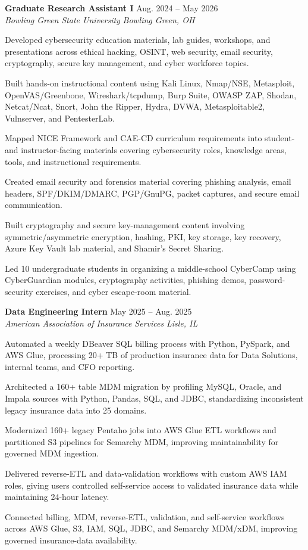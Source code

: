 \documentclass[letterpaper,10pt]{article}
\newcommand{\resumeSubheading}[4]{
  \vspace{2pt}
  \textbf{#1} \hfill #2\\
  \textit{#3} \hfill \textit{#4}
}
\begin{document}
\resumeSubheading
{Graduate Research Assistant I}{Aug. 2024 -- May 2026}
{Bowling Green State University}{Bowling Green, OH}
\begin{tightitemize}
  \item Developed cybersecurity education materials, lab guides, workshops, and presentations across ethical hacking, OSINT, web security, email security, cryptography, secure key management, and cyber workforce topics.
  \item Built hands-on instructional content using Kali Linux, Nmap/NSE, Metasploit, OpenVAS/Greenbone, Wireshark/tcpdump, Burp Suite, OWASP ZAP, Shodan, Netcat/Ncat, Snort, John the Ripper, Hydra, DVWA, Metasploitable2, Vulnserver, and PentesterLab.
  \item Mapped NICE Framework and CAE-CD curriculum requirements into student- and instructor-facing materials covering cybersecurity roles, knowledge areas, tools, and instructional requirements.
  \item Created email security and forensics material covering phishing analysis, email headers, SPF/DKIM/DMARC, PGP/GnuPG, packet captures, and secure email communication.
  \item Built cryptography and secure key-management content involving symmetric/asymmetric encryption, hashing, PKI, key storage, key recovery, Azure Key Vault lab material, and Shamir's Secret Sharing.
  \item Led 10 undergraduate students in organizing a middle-school CyberCamp using CyberGuardian modules, cryptography activities, phishing demos, password-security exercises, and cyber escape-room material.
\end{tightitemize}

\resumeSubheading
{Data Engineering Intern}{May 2025 -- Aug. 2025}
{American Association of Insurance Services}{Lisle, IL}
\begin{tightitemize}
  \item Automated a weekly DBeaver SQL billing process with Python, PySpark, and AWS Glue, processing 20+ TB of production insurance data for Data Solutions, internal teams, and CFO reporting.
  \item Architected a 160+ table MDM migration by profiling MySQL, Oracle, and Impala sources with Python, Pandas, SQL, and JDBC, standardizing inconsistent legacy insurance data into 25 domains.
  \item Modernized 160+ legacy Pentaho jobs into AWS Glue ETL workflows and partitioned S3 pipelines for Semarchy MDM, improving maintainability for governed MDM ingestion.
  \item Delivered reverse-ETL and data-validation workflows with custom AWS IAM roles, giving users controlled self-service access to validated insurance data while maintaining 24-hour latency.
  \item Connected billing, MDM, reverse-ETL, validation, and self-service workflows across AWS Glue, S3, IAM, SQL, JDBC, and Semarchy MDM/xDM, improving governed insurance-data availability.
\end{tightitemize}
\end{document}
